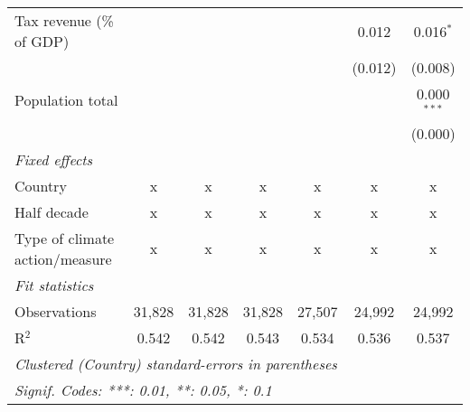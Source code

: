 \begin{tabular}{lcccccc}
   Tax revenue (\% of GDP)                       &         &         &             &              & 0.012        & 0.016$^{*}$\\   
                                                 &         &         &             &              & (0.012)      & (0.008)\\   
   Population total                              &         &         &             &              &              & 0.000$^{***}$\\   
                                                 &         &         &             &              &              & (0.000)\\   
   \emph{Fixed effects}\\
   Country                                       & x       & x       & x           & x            & x            & x\\  
   Half decade                                   & x       & x       & x           & x            & x            & x\\  
   Type of climate action/measure                & x       & x       & x           & x            & x            & x\\  
   \midrule \emph{Fit statistics}\\
   Observations                                  & 31,828  & 31,828  & 31,828      & 27,507       & 24,992       & 24,992\\  
   R$^2$                                         & 0.542   & 0.542   & 0.543       & 0.534        & 0.536        & 0.537\\  
   \midrule
   \multicolumn{7}{l}{\emph{Clustered (Country) standard-errors in parentheses}}\\
   \multicolumn{7}{l}{\emph{Signif. Codes: ***: 0.01, **: 0.05, *: 0.1}}\\
\end{tabular}
\par\endgroup


